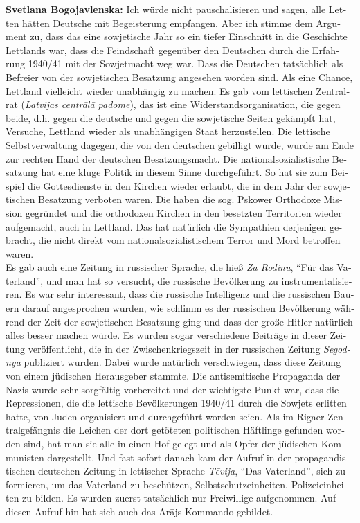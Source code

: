 \begin{otherlanguage}{ngerman}
\textbf{Svetlana Bogojavlenska:} Ich würde nicht pauschalisieren und sagen, alle Letten hätten Deutsche mit Begeisterung empfangen. Aber ich stimme dem Argument zu, dass das eine sowjetische Jahr so ein tiefer Einschnitt in die Geschichte Lettlands war, dass die Feindschaft gegenüber den Deutschen durch die Erfahrung 1940/41 mit der Sowjetmacht weg war. Dass die Deutschen tatsächlich als Befreier von der sowjetischen Besatzung angesehen worden sind. Als eine Chance, Lettland vielleicht wieder unabhängig zu machen. Es gab vom lettischen Zentralrat (\textit{Latvijas centrālā padome}), das ist eine Widerstandsorganisation, die gegen beide, d.h. gegen die deutsche und gegen die sowjetische Seiten gekämpft hat, Versuche, Lettland wieder als unabhängigen Staat herzustellen. Die lettische Selbstverwaltung dagegen, die von den deutschen gebilligt wurde, wurde am Ende zur rechten Hand der deutschen Besatzungsmacht. Die nationalsozialistische Besatzung hat eine kluge Politik in diesem Sinne durchgeführt. So hat sie zum Beispiel die Gottesdienste in den Kirchen wieder erlaubt, die in dem Jahr der sowjetischen Besatzung verboten waren. Die haben die sog. Pskower Orthodoxe Mission gegründet und die orthodoxen Kirchen in den besetzten Territorien wieder aufgemacht, auch in Lettland. Das hat natürlich die Sympathien derjenigen gebracht, die nicht direkt vom nationalsozialistischem Terror und Mord betroffen waren.\\
Es gab auch eine Zeitung in russischer Sprache, die hieß \textit{Za Rodinu}, "`Für das Vaterland"', und man hat so versucht, die russische Bevölkerung zu instrumentalisieren. Es war sehr interessant, dass die russische Intelligenz und die russischen Bauern darauf angesprochen wurden, wie schlimm es der russischen Bevölkerung während der Zeit der sowjetischen Besatzung ging und dass der große Hitler natürlich alles besser machen würde. Es wurden sogar verschiedene Beiträge in dieser Zeitung veröffentlicht, die in der Zwischenkriegszeit in der russischen Zeitung \textit{Segodnya} publiziert wurden. Dabei wurde natürlich verschwiegen, dass diese Zeitung von einem jüdischen Herausgeber stammte. 
Die antisemitische Propaganda der Nazis wurde sehr sorgfältig vorbereitet und der wichtigste Punkt war, dass die Repressionen, die die lettische Bevölkerungen 1940/41 durch die Sowjets erlitten hatte, von Juden organisiert und durchgeführt worden seien. Als im Rigaer Zentralgefängnis die Leichen der dort getöteten politischen Häftlinge gefunden worden sind, hat man sie alle in einen Hof gelegt und als Opfer der jüdischen Kommunisten dargestellt. Und fast sofort danach kam der Aufruf in der propagandistischen deutschen Zeitung in lettischer Sprache \textit{Tēvija}, "`Das Vaterland"', sich zu formieren, um das Vaterland zu beschützen, Selbstschutzeinheiten, Polizeieinheiten zu bilden. Es wurden zuerst tatsächlich nur Freiwillige aufgenommen. Auf diesen Aufruf hin hat sich auch das Arājs-Kommando gebildet.


\end{otherlanguage}
